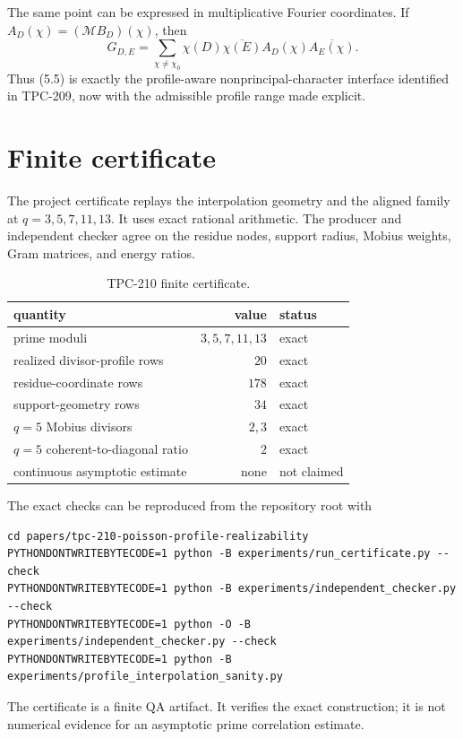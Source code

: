 \documentclass[11pt]{article}
\newcommand{\M}{\mathcal M}
\begin{document}
The same point can be expressed in multiplicative Fourier coordinates.  If
$A_D(\chi)=(\M B_D)(\chi)$, then
\[
 G_{D,E}=\sum_{\chi\ne\chi_0}
 \chi(D)\overline{\chi(E)}A_D(\chi)\overline{A_E(\chi)}.
 \tag{5.5}
\]
Thus (5.5) is exactly the profile-aware nonprincipal-character interface
identified in TPC-209, now with the admissible profile range made explicit.

\section{Finite certificate}

The project certificate replays the interpolation geometry and the aligned
family at $q=3,5,7,11,13$.  It uses exact rational arithmetic.  The producer
and independent checker agree on the residue nodes, support radius, Mobius
weights, Gram matrices, and energy ratios.

\begin{table}[t]
\centering
\caption{TPC-210 finite certificate.}
\label{tab:certificate}
\begin{tabular}{@{}lrl@{}}
\toprule
quantity & value & status \\
\midrule
prime moduli & $3,5,7,11,13$ & exact \\
realized divisor-profile rows & $20$ & exact \\
residue-coordinate rows & $178$ & exact \\
support-geometry rows & $34$ & exact \\
$q=5$ Mobius divisors & $2,3$ & exact \\
$q=5$ coherent-to-diagonal ratio & $2$ & exact \\
continuous asymptotic estimate & none & not claimed \\
\bottomrule
\end{tabular}
\end{table}

The exact checks can be reproduced from the repository root with
\begin{verbatim}
cd papers/tpc-210-poisson-profile-realizability
PYTHONDONTWRITEBYTECODE=1 python -B experiments/run_certificate.py --check
PYTHONDONTWRITEBYTECODE=1 python -B experiments/independent_checker.py --check
PYTHONDONTWRITEBYTECODE=1 python -O -B experiments/independent_checker.py --check
PYTHONDONTWRITEBYTECODE=1 python -B experiments/profile_interpolation_sanity.py
\end{verbatim}

The certificate is a finite QA artifact.  It verifies the exact construction;
it is not numerical evidence for an asymptotic prime correlation estimate.
\end{document}
